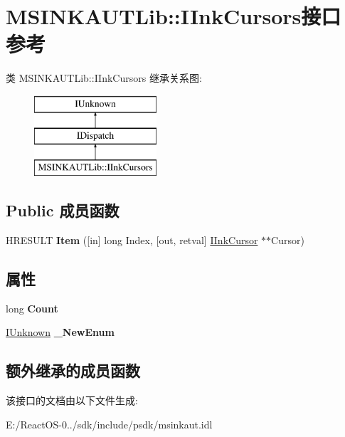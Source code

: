 \hypertarget{interface_m_s_i_n_k_a_u_t_lib_1_1_i_ink_cursors}{}\section{M\+S\+I\+N\+K\+A\+U\+T\+Lib\+:\+:I\+Ink\+Cursors接口 参考}
\label{interface_m_s_i_n_k_a_u_t_lib_1_1_i_ink_cursors}
类 M\+S\+I\+N\+K\+A\+U\+T\+Lib\+:\+:I\+Ink\+Cursors 继承关系图\+:\begin{figure}[H]
\begin{center}
\leavevmode
\includegraphics[height=3.000000cm]{interface_m_s_i_n_k_a_u_t_lib_1_1_i_ink_cursors}
\end{center}
\end{figure}
\subsection*{Public 成员函数}
\begin{DoxyCompactItemize}
\item 
\mbox{\label{interface_m_s_i_n_k_a_u_t_lib_1_1_i_ink_cursors_a9e156b601f1a0e1a6977e25d7259d43c}} 
H\+R\+E\+S\+U\+LT {\bfseries Item} (\mbox{[}in\mbox{]} long Index, \mbox{[}out, retval\mbox{]} \hyperlink{interface_m_s_i_n_k_a_u_t_lib_1_1_i_ink_cursor}{I\+Ink\+Cursor} $\ast$$\ast$Cursor)
\end{DoxyCompactItemize}
\subsection*{属性}
\begin{DoxyCompactItemize}
\item 
\mbox{\label{interface_m_s_i_n_k_a_u_t_lib_1_1_i_ink_cursors_a763dcc8782b50b61774cb240399a3aca}} 
long {\bfseries Count}
\item 
\mbox{\label{interface_m_s_i_n_k_a_u_t_lib_1_1_i_ink_cursors_a13ab8179a8f91f44acffe8654ff568d4}} 
\hyperlink{interface_i_unknown}{I\+Unknown} {\bfseries \+\_\+\+New\+Enum}
\end{DoxyCompactItemize}
\subsection*{额外继承的成员函数}


该接口的文档由以下文件生成\+:\begin{DoxyCompactItemize}
\item 
E\+:/\+React\+O\+S-\/0../sdk/include/psdk/msinkaut.\+idl\end{DoxyCompactItemize}
